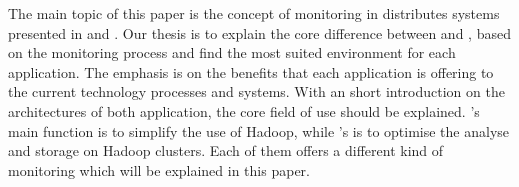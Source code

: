  
The main topic of this paper is the concept of monitoring in distributes systems presented in \ambshort and \chukshort. 
Our thesis is to explain the core difference between \ambshort and \chukshort, based on the monitoring process and find the most suited environment for each application. 
The emphasis is on the benefits that each application is offering to the current technology processes and systems. 
With an short introduction on the architectures of both application, the core field of use should be explained. 
\ambshort's main function is to simplify the use of Hadoop, while \chukshort's is to optimise the analyse and storage on Hadoop clusters. Each of them offers a different kind of monitoring which will be explained in this paper.